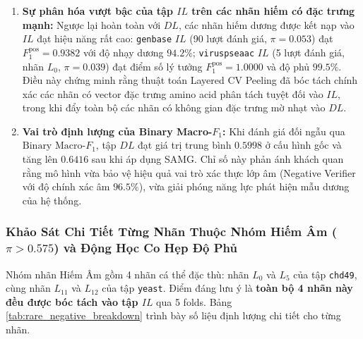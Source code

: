 \documentclass[10pt,a4paper]{article}
\begin{document}
\begin{enumerate}[leftmargin=*]
    \item \textbf{Sự phân hóa vượt bậc của tập $IL$ trên các nhãn hiếm có đặc trưng mạnh:} 
    Ngược lại hoàn toàn với $DL$, các nhãn hiếm dương được kết nạp vào $IL$ đạt hiệu năng rất cao: \texttt{genbase} $IL$ (90 lượt đánh giá, $\pi=0.053$) đạt $F_1^{\text{pos}} = 0.9382$ với độ nhạy dương $94.2\%$; \texttt{viruspseaac} $IL$ (5 lượt đánh giá, nhãn $L_0$, $\pi=0.039$) đạt điểm số lý tưởng $F_1^{\text{pos}} = 1.0000$ và độ phủ $99.5\%$. Điều này chứng minh rằng thuật toán Layered CV Peeling đã bóc tách chính xác các nhãn có vector đặc trưng amino acid phân tách tuyệt đối vào $IL$, trong khi đẩy toàn bộ các nhãn có không gian đặc trưng mờ nhạt vào $DL$.
    \item \textbf{Vai trò định lượng của Binary Macro-$F_1$:} Khi đánh giá đối ngẫu qua $\text{Binary Macro-}F_1$, tập $DL$ đạt giá trị trung bình $0.5998$ ở cấu hình gốc và tăng lên $\mathbf{0.6416}$ sau khi áp dụng SAMG. Chỉ số này phản ánh khách quan rằng mô hình vừa bảo vệ hiệu quả vai trò xác thực lớp âm (Negative Verifier với độ chính xác âm $96.5\%$), vừa giải phóng năng lực phát hiện mẫu dương của hệ thống.
\end{enumerate}

\subsubsection{Khảo Sát Chi Tiết Từng Nhãn Thuộc Nhóm Hiếm Âm (\texorpdfstring{$\pi > 0.575$}{pi > 0.575}) và Động Học Co Hẹp Độ Phủ}
Nhóm nhãn Hiếm Âm gồm 4 nhãn cá thể đặc thù: nhãn $L_0$ và $L_5$ của tập \texttt{chd49}, cùng nhãn $L_{11}$ và $L_{12}$ của tập \texttt{yeast}. Điểm đáng lưu ý là \textbf{toàn bộ 4 nhãn này đều được bóc tách vào tập $IL$} qua 5 folds. Bảng \ref{tab:rare_negative_breakdown} trình bày số liệu định lượng chi tiết cho từng nhãn.
\end{document}
